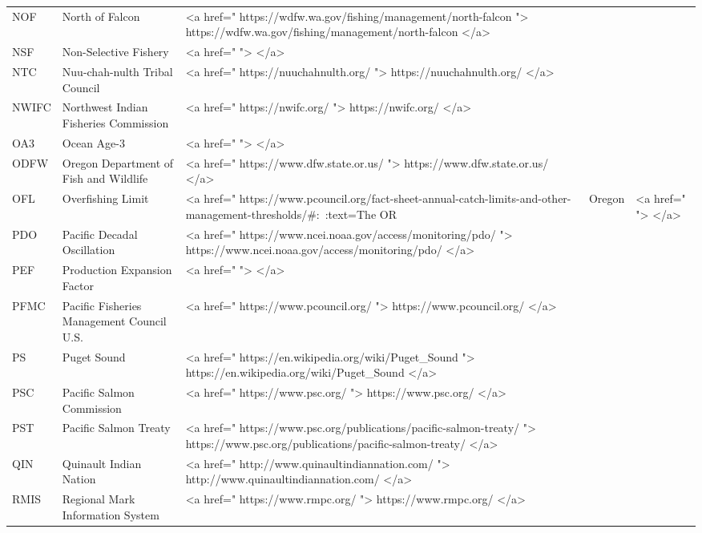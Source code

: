 \documentclass[
  letterpaper,
  DIV=11,
  numbers=noendperiod]{scrartcl}
\begin{document}
\begin{table}
\begin{tabular*}{\linewidth}{@{\extracolsep{\fill}}lll}
NOF & North of Falcon & <a href=" https://wdfw.wa.gov/fishing/management/north-falcon "> https://wdfw.wa.gov/fishing/management/north-falcon </a> \\ 
NSF & Non-Selective Fishery & <a href="  ">  </a> \\ 
NTC & Nuu-chah-nulth Tribal Council & <a href=" https://nuuchahnulth.org/ "> https://nuuchahnulth.org/ </a> \\ 
NWIFC & Northwest Indian Fisheries Commission & <a href=" https://nwifc.org/ "> https://nwifc.org/ </a> \\ 
OA3 & Ocean Age-3 & <a href="  ">  </a> \\ 
ODFW & Oregon Department of Fish and Wildlife & <a href=" https://www.dfw.state.or.us/ "> https://www.dfw.state.or.us/ </a> \\ 
OFL & Overfishing Limit & <a href=" https://www.pcouncil.org/fact-sheet-annual-catch-limits-and-other-management-thresholds/#:~:text=The%
OR & Oregon & <a href="  ">  </a> \\ 
PDO & Pacific Decadal Oscillation & <a href=" https://www.ncei.noaa.gov/access/monitoring/pdo/ "> https://www.ncei.noaa.gov/access/monitoring/pdo/ </a> \\ 
PEF & Production Expansion Factor & <a href="  ">  </a> \\ 
PFMC & Pacific Fisheries Management Council U.S. & <a href=" https://www.pcouncil.org/ "> https://www.pcouncil.org/ </a> \\ 
PS & Puget Sound & <a href=" https://en.wikipedia.org/wiki/Puget_Sound "> https://en.wikipedia.org/wiki/Puget_Sound </a> \\ 
PSC & Pacific Salmon Commission & <a href=" https://www.psc.org/ "> https://www.psc.org/ </a> \\ 
PST & Pacific Salmon Treaty & <a href=" https://www.psc.org/publications/pacific-salmon-treaty/ "> https://www.psc.org/publications/pacific-salmon-treaty/ </a> \\ 
QIN & Quinault Indian Nation & <a href=" http://www.quinaultindiannation.com/ "> http://www.quinaultindiannation.com/ </a> \\ 
RMIS & Regional Mark Information System & <a href=" https://www.rmpc.org/ "> https://www.rmpc.org/ </a> \\ 

\end{tabular*}
\end{table}
\end{document}
